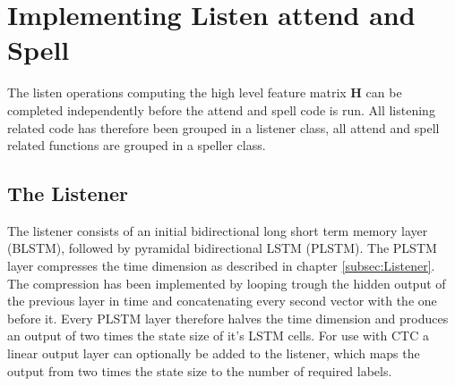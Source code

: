 \section{Implementing Listen attend and Spell}
The listen operations computing the high level feature matrix $\mathbf{H}$ can be completed independently before the attend and spell code is run. All listening related code has therefore been grouped in a listener class, all attend and spell related functions are grouped in a speller class.

\subsection{The Listener}
The listener consists of an initial bidirectional long short term memory layer (BLSTM), followed by pyramidal bidirectional LSTM (PLSTM). The PLSTM layer compresses the time dimension as described in chapter \ref{subsec:Listener}. The compression has been implemented by looping trough the hidden output of the previous layer in time and concatenating every second vector with the one before it. Every PLSTM layer therefore halves the time dimension and produces an output of two times the state size of it's LSTM cells. 
For use with CTC a linear output layer can optionally be added to the listener, which maps the output from two times the state size to the number of required labels. 

